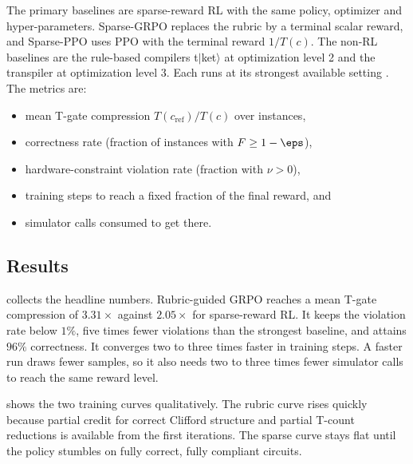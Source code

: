 The primary baselines are sparse-reward RL with the same policy, optimizer and hyper-parameters. Sparse-GRPO replaces the rubric by a terminal scalar reward, and Sparse-PPO uses PPO with the terminal reward $1/T(c)$. The non-RL baselines are the rule-based compilers t$|$ket$\rangle$ at optimization level 2 and the \qiskit{} transpiler at optimization level 3. Each runs at its strongest available setting \cite{guo2026rubriq}. The metrics are:
\begin{itemize}
  \item mean T-gate compression $T(c_{\mathrm{ref}})/T(c)$ over instances,
  \item correctness rate (fraction of instances with $F\ge 1-\eps$),
  \item hardware-constraint violation rate (fraction with $\nu>0$),
  \item training steps to reach a fixed fraction of the final reward, and
  \item simulator calls consumed to get there.
\end{itemize}

\subsection{Results}\label{sec:syn:mainresults}

 collects the headline numbers. Rubric-guided GRPO reaches a mean T-gate compression of $3.31\times$ against $2.05\times$ for sparse-reward RL. It keeps the violation rate below $1\%$, five times fewer violations than the strongest baseline, and attains $96\%$ correctness. It converges two to three times faster in training steps. A faster run draws fewer samples, so it also needs two to three times fewer simulator calls to reach the same reward level.

 shows the two training curves qualitatively. The rubric curve rises quickly because partial credit for correct Clifford structure and partial T-count reductions is available from the first iterations. The sparse curve stays flat until the policy stumbles on fully correct, fully compliant circuits.

